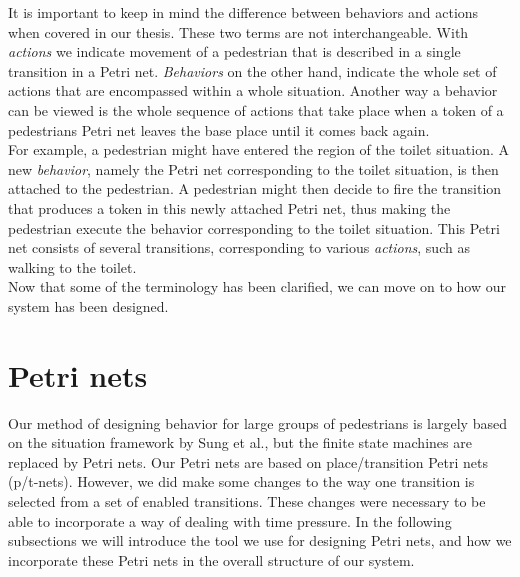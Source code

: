 \documentclass[11pt, a4paper]{book}
\begin{document}
It is important to keep in mind the difference between behaviors and actions when covered in our thesis. These two terms are not interchangeable. With \emph{actions} we indicate movement of a pedestrian that is described in a single transition in a Petri net. \emph{Behaviors} on the other hand, indicate the whole set of actions that are encompassed within a whole situation. Another way a behavior can be viewed is the whole sequence of actions that take place when a token of a pedestrians Petri net leaves the base place until it comes back again. \\
For example, a pedestrian might have entered the region of the toilet situation. A new \emph{behavior}, namely the Petri net corresponding to the toilet situation, is then attached to the pedestrian. A pedestrian might then decide to fire the transition that produces a token in this newly attached Petri net, thus making the pedestrian execute the behavior corresponding to the toilet situation. This Petri net consists of several transitions, corresponding to various \emph{actions}, such as walking to the toilet.\\
Now that some of the terminology has been clarified, we can move on to how our system has been designed.


\section{Petri nets}
Our method of designing behavior for large groups of pedestrians is largely based on the situation framework by Sung et al., but the finite state machines are replaced by Petri nets.
Our Petri nets are based on place/transition Petri nets (p/t-nets)\cite{desel1998place}. However, we did make some changes to the way one transition is selected from a set of enabled transitions. These changes were necessary to be able to incorporate a way of dealing with time pressure. In the following subsections we will introduce the tool we use for designing Petri nets, and how we incorporate these Petri nets in the overall structure of our system.
\end{document}
